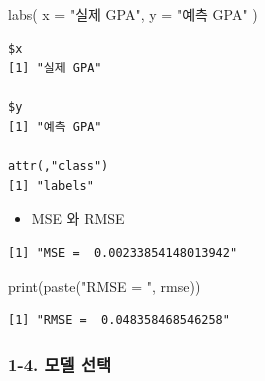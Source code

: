 \documentclass[
  letterpaper,
  DIV=11,
  numbers=noendperiod]{scrartcl}
\newenvironment{Shaded}{\begin{snugshade}}{\end{snugshade}}
\newcommand{\AttributeTok}[1]{\textcolor[rgb]{0.40,0.45,0.13}{#1}}
\newcommand{\CommentTok}[1]{\textcolor[rgb]{0.37,0.37,0.37}{#1}}
\newcommand{\DecValTok}[1]{\textcolor[rgb]{0.68,0.00,0.00}{#1}}
\newcommand{\FunctionTok}[1]{\textcolor[rgb]{0.28,0.35,0.67}{#1}}
\newcommand{\NormalTok}[1]{\textcolor[rgb]{0.00,0.23,0.31}{#1}}
\newcommand{\OtherTok}[1]{\textcolor[rgb]{0.00,0.23,0.31}{#1}}
\newcommand{\SpecialCharTok}[1]{\textcolor[rgb]{0.37,0.37,0.37}{#1}}
\newcommand{\StringTok}[1]{\textcolor[rgb]{0.13,0.47,0.30}{#1}}
\providecommand{\tightlist}{%
  \setlength{\itemsep}{0pt}\setlength{\parskip}{0pt}}\usepackage{longtable,booktabs,array}
\begin{document}
\begin{Shaded}
\begin{Highlighting}[]
  \FunctionTok{labs}\NormalTok{( }
    \AttributeTok{x =} \StringTok{"실제 GPA"}\NormalTok{, }\AttributeTok{y =} \StringTok{"예측 GPA"}
\NormalTok{    )}
\end{Highlighting}
\end{Shaded}

\begin{verbatim}
$x
[1] "실제 GPA"

$y
[1] "예측 GPA"

attr(,"class")
[1] "labels"
\end{verbatim}

\begin{itemize}
\tightlist
\item
  MSE 와 RMSE
\end{itemize}

\begin{Shaded}
\end{Shaded}

\begin{verbatim}
[1] "MSE =  0.00233854148013942"
\end{verbatim}

\begin{Shaded}
\begin{Highlighting}[]
\FunctionTok{print}\NormalTok{(}\FunctionTok{paste}\NormalTok{(}\StringTok{"RMSE = "}\NormalTok{, rmse))}
\end{Highlighting}
\end{Shaded}

\begin{verbatim}
[1] "RMSE =  0.048358468546258"
\end{verbatim}

\subsubsection{1-4. 모델 선택}\label{uxbaa8uxb378-uxc120uxd0dd}
\end{document}
